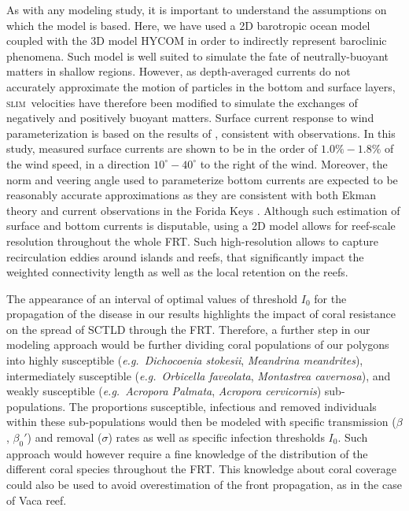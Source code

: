 \documentclass[utf8]{frontiersSCNS}
\newcommand{\slim}{\textsc{slim}\ }
\newcommand{\eg}{{\it e.g.}\ }
\begin{document}
As with any modeling study, it is important to understand the assumptions on which the model is based. Here, we have used a 2D barotropic ocean model coupled with the 3D model HYCOM \citep{Chassignet2007} in order to indirectly represent baroclinic phenomena. Such model is well suited to simulate the fate of neutrally-buoyant matters in shallow regions. However, as depth-averaged currents do not accurately approximate the motion of particles in the bottom and surface layers, \slim velocities have therefore been modified to simulate the exchanges of negatively and positively buoyant matters. Surface current response to wind parameterization is based on the results of \cite{ardhuin2009observation}, consistent with observations. In this study, measured surface currents are shown to be in the order of $1.0\% - 1.8\%$ of the wind speed, in a direction $10^\circ - 40^\circ$ to the right of the wind. Moreover, the norm and veering angle used to parameterize bottom currents are expected to be reasonably accurate approximations as they are consistent with both Ekman theory and current observations in the Forida Keys \citep{perlin2007organization, kundu1976ekman, smith2009influence}. Although such estimation of surface and bottom currents is disputable, using a 2D model allows for reef-scale resolution throughout the whole FRT. Such high-resolution allows to capture recirculation eddies around islands and reefs, that significantly impact the weighted connectivity length as well as the local retention on the reefs.

The appearance of an interval of optimal values of threshold $I_0$ for the propagation of the disease in our results highlights the impact of coral resistance on the spread of SCTLD through the FRT. Therefore, a further step in our modeling approach would be further dividing coral populations of our polygons into highly susceptible (\eg \textit{Dichocoenia stokesii}, \textit{Meandrina meandrites}), intermediately susceptible (\eg \textit{Orbicella faveolata}, \textit{Montastrea cavernosa}), and weakly susceptible (\eg \textit{Acropora Palmata}, \textit{Acropora cervicornis}) sub-populations. The proportions susceptible, infectious and removed individuals within these sub-populations would then be modeled with specific transmission ($\beta$, $\beta_0'$) and removal ($\sigma$) rates as well as specific infection thresholds $I_0$. Such approach would however require a fine knowledge of the distribution of the different coral species throughout the FRT. This knowledge about coral coverage could also be used to avoid overestimation of the front propagation, as in the case of Vaca reef.
\end{document}
